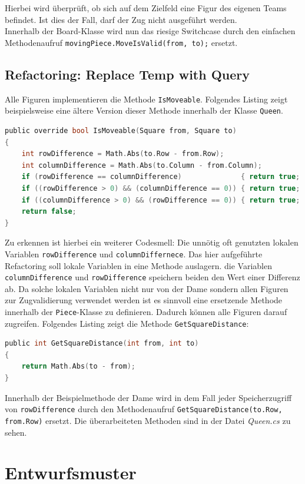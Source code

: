 \documentclass[
10pt, %
a4paper, %
oneside, %
headinclude,footinclude, %
BCOR5mm, %
]{scrartcl}
\begin{document}
\begin{onehalfspace}
Hierbei wird überprüft, ob sich auf dem Zielfeld eine Figur des eigenen Teams befindet. Ist dies der Fall, darf der Zug nicht ausgeführt werden.\\
Innerhalb der Board-Klasse wird nun das riesige Switchcase durch den einfachen Methodenaufruf \texttt{movingPiece.MoveIsValid(from, to);} ersetzt.

\subsection{Refactoring: Replace Temp with Query}
\label{sec:replTemp}
Alle Figuren implementieren die Methode \texttt{IsMoveable}. Folgendes Listing zeigt beispielsweise eine ältere Version dieser Methode innerhalb der Klasse \texttt{Queen}.


\begin{lstlisting}[language=c, style=mStyle]
public override bool IsMoveable(Square from, Square to)
{
	int rowDifference = Math.Abs(to.Row - from.Row);
	int columnDifference = Math.Abs(to.Column - from.Column);
	if (rowDifference == columnDifference)              { return true; }
	if ((rowDifference > 0) && (columnDifference == 0)) { return true; }
	if ((columnDifference > 0) && (rowDifference == 0)) { return true; }
	return false;
}
\end{lstlisting}
Zu erkennen ist hierbei ein weiterer Codesmell: Die unnötig oft genutzten lokalen Variablen \texttt{rowDifference} und \texttt{columnDiffernece}. Das hier aufgeführte Refactoring soll lokale Variablen in eine Methode auslagern. die Variablen \texttt{columnDifference} und \texttt{rowDifference} speichern beiden den Wert einer Differenz ab. Da solche lokalen Variablen nicht nur von der Dame sondern allen Figuren zur Zugvalidierung verwendet werden ist es sinnvoll eine ersetzende Methode innerhalb der \texttt{Piece}-Klasse zu definieren. Dadurch können alle Figuren darauf zugreifen. Folgendes Listing zeigt die Methode \texttt{GetSquareDistance}:

\begin{lstlisting}[language=c, style=mStyle]
public int GetSquareDistance(int from, int to)
{
	return Math.Abs(to - from);
}
\end{lstlisting}

Innerhalb der Beispielmethode der Dame wird in dem Fall jeder Speicherzugriff von \texttt{rowDifference} durch den Methodenaufruf \texttt{GetSquareDistance(to.Row, from.Row)} ersetzt. Die überarbeiteten Methoden sind in der Datei \textit{Queen.cs} zu sehen. 
\newpage
\section{Entwurfsmuster}


\end{onehalfspace}
\end{document}
